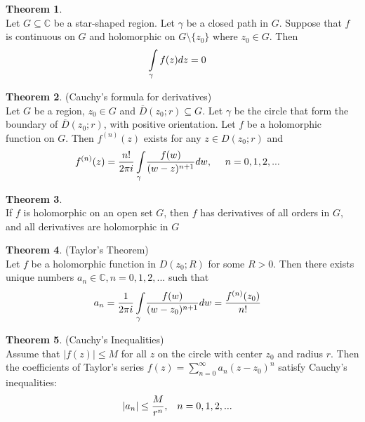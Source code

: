 \documentclass[letterpaper, 11pt]{article}
\newcommand{\C}{\mathbb{C}}   %
\newcommand{\1}{\mathds{1}}	%
\theoremstyle{definition}
\newtheorem{theorem}{Theorem}[section]
\begin{document}
\newpage

\begin{theorem} ~\\
Let $G \subseteq \C$ be a star-shaped region. Let $\gamma$ be a closed path in $G$. Suppose that $f$ is continuous on $G$ and holomorphic on $G \setminus \{z_0\}$ where $z_0 \in G$. Then
\begin{align}
\int \limits _{\gamma} f(z) dz & = 0 \notag
\end{align}
\end{theorem}

\begin{theorem} (Cauchy's formula for derivatives) \\
Let $G$ be a region, $z_0 \in G$ and $\overline{D}(z_0; r) \subseteq G$. Let $\gamma$ be the circle that form the boundary of $\overline{D}(z_0; r)$, with positive orientation. Let $f$ be a holomorphic function on $G$. Then $f^{(n)}(z)$ exists for any $z \in D(z_0; r)$ and 
\begin{align}
f^{(n)}(z) = \frac{n!}{2\pi i}\int \limits _{\gamma} & \frac{f(w)}{(w-z)^{n+1}} dw, \ \ \ \ n = 0, 1, 2, ... \notag
\end{align}
\end{theorem}

\begin{theorem} ~\\
If $f$ is holomorphic on an open set $G$, then $f$ has derivatives of all orders in $G$, and all derivatives are holomorphic in $G$
\end{theorem}

\begin{theorem} (Taylor's Theorem) \\
Let $f$ be a holomorphic function in $D(z_0; R)$ for some $R > 0$. Then there exists unique numbers $a_n \in \C, n = 0, 1, 2, ...$ such that
\begin{align}
a_n = \frac{1}{2\pi i}\int \limits _{\gamma} & \frac{f(w)}{(w-z_0)^{n+1}} dw = \frac{f^{(n)}(z_0)}{n!} \notag
\end{align}
\end{theorem}

\begin{theorem} (Cauchy's Inequalities) \\
Assume that $|f(z)| \le M$ for all $z$ on the circle with center $z_0$ and radius $r$. Then the coefficients of Taylor's series $f(z) = \sum \limits _{n=0} ^{\infty} a_n(z-z_0)^n$ satisfy Cauchy's inequalities:
\begin{align}
|a_n| \le \frac{M}{r^n}, & \ \ \ n = 0,1,2,... \notag
\end{align}
\end{theorem}
\end{document}
